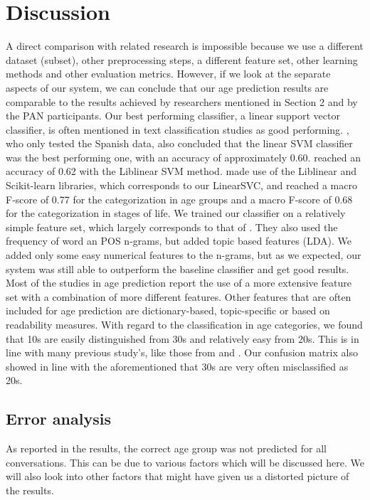 \documentclass{clv3}
\begin{document}
\section{Discussion}
A direct comparison with related research is impossible because we use a different dataset (subset), other preprocessing steps, a different feature set, other learning methods and other evaluation metrics. However, if we look at the separate aspects of our system, we can conclude that our age prediction results are comparable to the results achieved by researchers mentioned in Section 2 and by the PAN participants. Our best performing classifier, a linear support vector classifier, is often mentioned in text classification studies as good performing. \citet{meina2013ensemble}, who only tested the Spanish data, also concluded that the linear SVM classifier was the best performing one, with an accuracy of approximately 0.60. \citet{cruz2013italica} reached an accuracy of 0.62 with the Liblinear SVM method. \citet{nguyen2013old} made use of the Liblinear and Scikit-learn libraries, which corresponds to our LinearSVC, and reached a macro F-score of 0.77 for the categorization in age groups and a macro F-score of 0.68 for the categorization in stages of life. We trained our classifier on a relatively simple feature set, which largely corresponds to that of \citet{santosh2013author}. They also used the frequency of word an POS n-grams, but added topic based features (LDA). We added only some easy numerical features to the n-grams,  but as we expected, our system was still able to outperform the baseline classifier and get good results. Most of the studies in age prediction report the use of a more extensive feature set with a combination of more different features. Other features that are often included for age prediction are dictionary-based, topic-specific or based on readability measures. With regard to the classification in age categories, we found that 10s are easily distinguished from 30s and relatively easy from 20s. This is in line with many previous study's, like those from \citet{schler2006effects,argamon2009automatically} and \citet{nguyen2013old}. Our confusion matrix also showed in line with the aforementioned that 30s are very often misclassified as 20s.

\subsection*{Error analysis}
As reported in the results, the correct age group was not predicted for all conversations. This can be due to various factors which will be discussed here. We will also look into other factors that might have given us a distorted picture of the results.
\end{document}
